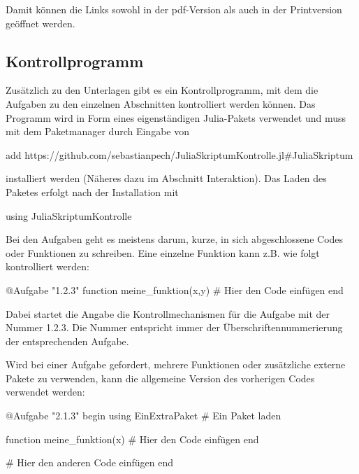 Damit können die Links sowohl in der pdf-Version als auch in der Printversion geöffnet werden.

\subsection{Kontrollprogramm}

Zusätzlich zu den Unterlagen gibt es ein Kontrollprogramm, mit dem die Aufgaben zu den einzelnen Abschnitten kontrolliert werden können.
Das Programm wird in Form eines eigenständigen Julia-Pakets verwendet und muss mit dem Paketmanager durch Eingabe von 

\begin{jlverbatim}
add https://github.com/sebastianpech/JuliaSkriptumKontrolle.jl#JuliaSkriptum
\end{jlverbatim}

installiert werden (Näheres dazu im Abschnitt Interaktion).
Das Laden des Paketes erfolgt nach der Installation mit

\begin{jlblock}
using JuliaSkriptumKontrolle
\end{jlblock}

Bei den Aufgaben geht es meistens darum, kurze, in sich abgeschlossene Codes oder Funktionen zu schreiben.
Eine einzelne Funktion kann z.B. wie folgt kontrolliert werden:

\begin{jlverbatim}
@Aufgabe "1.2.3" function meine_funktion(x,y)
    # Hier den Code einfügen
end
\end{jlverbatim}

Dabei startet die Angabe  die Kontrollmechanismen für die Aufgabe mit der Nummer 1.2.3.
Die Nummer entspricht immer der Überschriftennummerierung der entsprechenden Aufgabe.

Wird bei einer Aufgabe gefordert, mehrere Funktionen oder zusätzliche externe Pakete zu verwenden, kann die allgemeine Version des vorherigen Codes verwendet werden:

\begin{jlverbatim}
@Aufgabe "2.1.3" begin
    using EinExtraPaket # Ein Paket laden

    function meine_funktion(x)
        # Hier den Code einfügen
    end

    # Hier den anderen Code einfügen
end
\end{jlverbatim}

